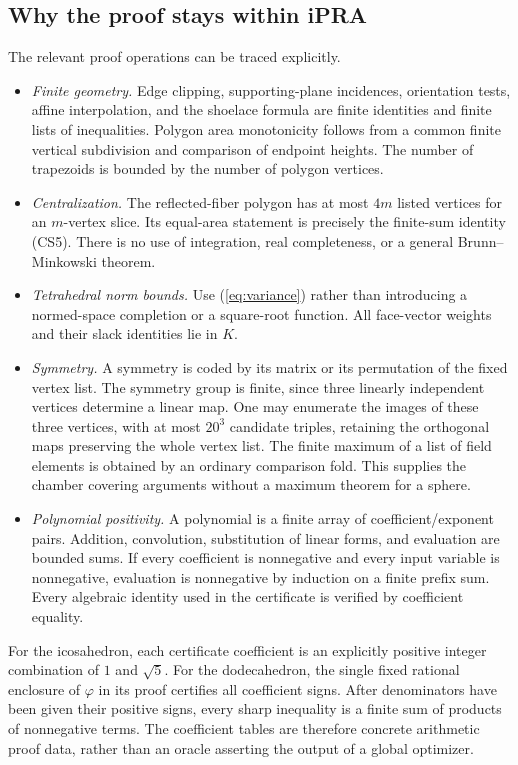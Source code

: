 \subsection{Why the proof stays within iPRA}
The relevant proof operations can be traced explicitly.
\begin{itemize}
\item \emph{Finite geometry.} Edge clipping, supporting-plane
incidences, orientation tests, affine interpolation, and the shoelace
formula are finite identities and finite lists of inequalities.
Polygon area monotonicity follows from a common finite vertical
subdivision and comparison of endpoint heights. The number of
trapezoids is bounded by the number of polygon vertices.
\item \emph{Centralization.} The reflected-fiber polygon has at most
$4m$ listed vertices for an $m$-vertex slice. Its equal-area statement
is precisely the finite-sum identity (CS5). There is no use of
integration, real completeness, or a general Brunn--Minkowski theorem.
\item \emph{Tetrahedral norm bounds.} Use (\ref{eq:variance}) rather
than introducing a normed-space completion or a square-root function.
All face-vector weights and their slack identities lie in $K$.
\item \emph{Symmetry.} A symmetry is coded by its matrix or its
permutation of the fixed vertex list. The symmetry group is finite,
since three linearly independent vertices determine a linear map.
One may enumerate the images of these three vertices, with at most
$20^3$ candidate triples, retaining the orthogonal maps preserving the
whole vertex list. The finite maximum of a list of field elements is
obtained by an ordinary comparison fold. This supplies the chamber
covering arguments without a maximum theorem for a sphere.
\item \emph{Polynomial positivity.} A polynomial is a finite array
of coefficient/exponent pairs. Addition, convolution, substitution of
linear forms, and evaluation are bounded sums. If every coefficient
is nonnegative and every input variable is nonnegative, evaluation is
nonnegative by induction on a finite prefix sum. Every algebraic
identity used in the certificate is verified by coefficient equality.
\end{itemize}

For the icosahedron, each certificate coefficient is an explicitly
positive integer combination of $1$ and $\sqrt5$. For the dodecahedron,
the single fixed rational enclosure of $\varphi$ in its proof certifies
all coefficient signs. After denominators have been given their
positive signs, every sharp inequality is a finite sum of products
of nonnegative terms. The coefficient tables are therefore concrete
arithmetic proof data, rather than an oracle asserting the output of
a global optimizer.

